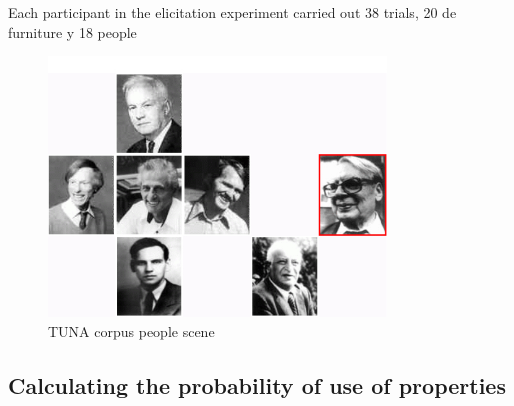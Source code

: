 Each participant in the elicitation experiment carried out 38 trials, 20 de furniture y 18 people 


\begin{figure}[ht]
\centering
\includegraphics[width=0.8\textwidth]{images/tuna-people.jpg}

\caption{TUNA corpus people scene}
\label{Tuna-people-scene}
\centering

\end{figure}

\subsection{Calculating the probability of use of properties}\label{calculate}

